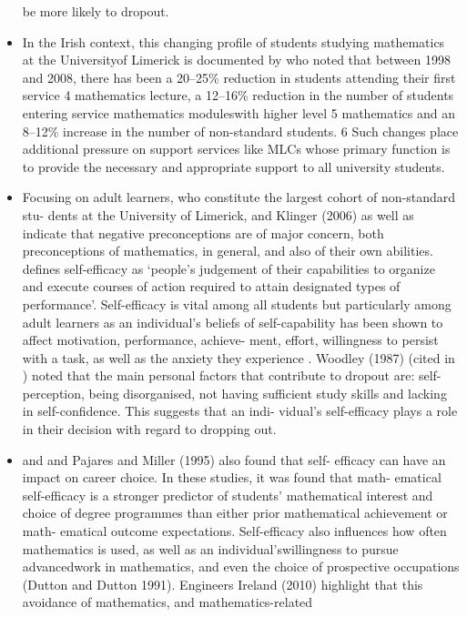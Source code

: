 \documentclass[twoside,12pt,a4paper]{report}
\begin{document}
\begin{itemize}
be more likely to dropout.
	\item In the Irish context,
this changing profile of students studying mathematics at the Universityof Limerick is
documented by \cite{Faulkner2010} who noted that between 1998
and 2008, there has been a 20–25\% reduction in students attending their first
service 4 mathematics lecture, a 12–16\% reduction in the number of students entering
service mathematics moduleswith higher level 5 mathematics and an 8–12\% increase in
the number of non-standard students. 6 Such changes place additional pressure on
support services like MLCs whose primary function is to provide the necessary and
appropriate support to all university students.
	\item Focusing on adult learners, who constitute the largest cohort of non-standard stu-
dents at the University of Limerick, \cite{Burton1987} and Klinger (2006) as well as \cite{Klinger2011} indicate
that negative preconceptions are of major concern, both preconceptions of
mathematics, in general, and also of their own abilities. \cite[pg391]{Bandura1997} defines
self-efficacy as ‘people’s judgement of their capabilities to organize and execute
courses of action required to attain designated types of performance’. Self-efficacy
is vital among all students but particularly among adult learners as an individual’s
beliefs of self-capability has been shown to affect motivation, performance, achieve-
ment, effort, willingness to persist with a task, as well as the anxiety they experience
\cite{Bandura1997, Pajares1994, Pajares1996, Pajares1997, Pajares1999}. 
Woodley (1987) (cited in \cite{McGivney1996}) noted that the main personal
factors that contribute to dropout are: self-perception, being disorganised, not
having sufficient study skills and lacking in self-confidence. This suggests that an indi-
vidual’s self-efficacy plays a role in their decision with regard to dropping out.
	\item \cite{Hackett1989} and \cite{Pajares1994} and Pajares and Miller (1995) also found that self-
efficacy can have an impact on career choice. In these studies, it was found that math-
ematical self-efficacy is a stronger predictor of students’ mathematical interest and
choice of degree programmes than either prior mathematical achievement or math-
ematical outcome expectations. Self-efficacy also influences how often mathematics
is used, as well as an individual’swillingness to pursue advancedwork in mathematics,
and even the choice of prospective occupations (Dutton and Dutton 1991). Engineers
Ireland (2010) highlight that this avoidance of mathematics, and mathematics-related

\end{itemize}
\end{document}
